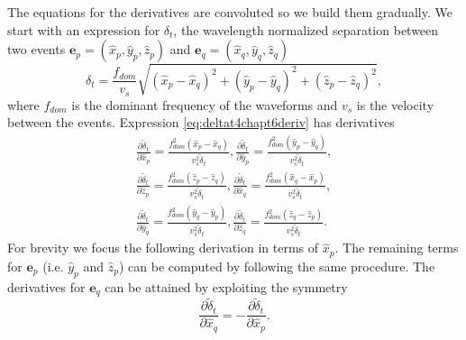 \documentclass[extra, onecolumn, doublespacing]{gji}
\begin{document}
The equations for the derivatives are convoluted so we build them
gradually. We start with an expression for $\delta_t$, the
wavelength normalized separation between two events $\mathbf{e}_p=
(\hat{x}_p,\hat{y}_p,\hat{z}_p)$ and $\mathbf{e}_q =
(\hat{x}_q,\hat{y}_q,\hat{z}_q)$
\begin{equation}
\label{eq:deltat4chapt6deriv}
\delta_t = \frac{f_{dom}}{v_s}\sqrt{(\hat{x}_p-\hat{x}_q)^2 + (\hat{y}_p-\hat{y}_q)^2 +  (\hat{z}_p-\hat{z}_q)^2},
\end{equation}
where $f_{dom}$ is the dominant frequency of the waveforms and $v_s$ is the velocity between the events. Expression
\ref{eq:deltat4chapt6deriv} has derivatives
\begin{equation}
\label{eq-partial-xyz1}
\begin{array}{l}
\frac{\partial \widetilde{\delta}_t}{\partial \hat{x}_p} = \frac{f_{dom}^2 (\hat{x}_p-\hat{x}_q)}{v_s^2 \widetilde{\delta}_t},
\frac{\partial \widetilde{\delta}_t}{\partial \hat{y}_p} = \frac{f_{dom}^2 (\hat{y}_p-\hat{y}_q)}{v_s^2 \widetilde{\delta}_t}, \\
\frac{\partial \widetilde{\delta}_t}{\partial \hat{z}_p} = \frac{f_{dom}^2 (\hat{z}_p-\hat{z}_q)}{v_s^2 \widetilde{\delta}_t},
\frac{\partial \widetilde{\delta}_t}{\partial \hat{x}_q} = \frac{f_{dom}^2 (\hat{x}_q-\hat{x}_p)}{v_s^2 \widetilde{\delta}_t}, \\
\frac{\partial \widetilde{\delta}_t}{\partial \hat{y}_q} = \frac{f_{dom}^2 (\hat{y}_q-\hat{y}_p)}{v_s^2 \widetilde{\delta}_t},
\frac{\partial \widetilde{\delta}_t}{\partial \hat{z}_q} = \frac{f_{dom}^2 (\hat{z}_q-\hat{z}_p)}{v_s^2 \widetilde{\delta}_t}.
\end{array}
\end{equation}
For brevity we focus the following derivation in terms of $\hat{x}_p$. The remaining terms for $\mathbf{e}_p$
(i.e. $\hat{y}_p$ and $\hat{z}_p$) can be computed
by following the same procedure. The derivatives for $\mathbf{e}_q$ can be attained by exploiting the symmetry
\begin{equation}
\label{eq:ep2eq-deriv-symmetry}
\frac{\partial \widetilde{\delta}_t}{\partial \hat{x}_q} = - \frac{\partial \widetilde{\delta}_t}{\partial \hat{x}_p}.
\end{equation}
\end{document}
